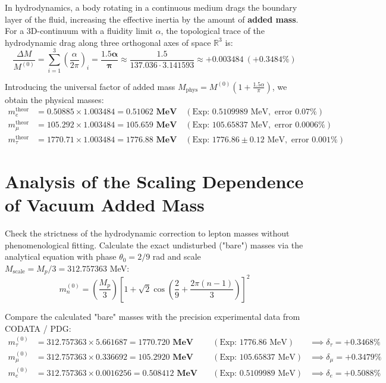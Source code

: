 \documentclass[12pt,a4paper]{article}
\begin{document}
	In hydrodynamics, a body rotating in a continuous medium drags the boundary layer of the fluid, increasing the effective inertia by the amount of \textbf{added mass}.
	For a 3D-continuum with a fluidity limit $\alpha$, the topological trace of the hydrodynamic drag along three orthogonal axes of space $\mathbb{R}^3$ is:
	\begin{equation}
		\frac{\Delta M}{M^{(0)}} = \sum_{i=1}^3 \left( \frac{\alpha}{2\pi} \right)_i = \mathbf{\frac{1.5\alpha}{\pi}} \approx \frac{1.5}{137.036 \cdot 3.141593} \approx +0.003484 \ (+0.3484\%)
	\end{equation}
	
	Introducing the universal factor of added mass $M_{\text{phys}} = M^{(0)} \left( 1 + \frac{1.5\alpha}{\pi} \right)$, we obtain the physical masses:
	\begin{align}
		m_e^{\text{theor}} &= 0.50885 \times 1.003484 = \mathbf{0.51062 \text{ MeV}} \quad (\text{Exp: } 0.5109989 \text{ MeV}, \text{ error } 0.07\%) \\
		m_\mu^{\text{theor}} &= 105.292 \times 1.003484 = \mathbf{105.659 \text{ MeV}} \quad (\text{Exp: } 105.65837 \text{ MeV}, \text{ error } 0.0006\%) \\
		m_\tau^{\text{theor}} &= 1770.71 \times 1.003484 = \mathbf{1776.88 \text{ MeV}} \quad (\text{Exp: } 1776.86 \pm 0.12 \text{ MeV}, \text{ error } 0.001\%)
	\end{align}
	
	\section{Analysis of the Scaling Dependence of Vacuum Added Mass}
	
	Check the strictness of the hydrodynamic correction to lepton masses without phenomenological fitting. 
	Calculate the exact undisturbed ("bare") masses via the analytical equation with phase $\theta_0 = 2/9$ rad and scale $M_{\text{scale}} = M_p/3 = 312.757363$ MeV:
	\begin{equation}
		m_n^{(0)} = \left(\frac{M_p}{3}\right) \left[ 1 + \sqrt{2} \cos\left( \frac{2}{9} + \frac{2\pi(n-1)}{3} \right) \right]^2
	\end{equation}
	
	Compare the calculated "bare" masses with the precision experimental data from CODATA / PDG:
	\begin{align}
		m_\tau^{(0)} &= 312.757363 \times 5.661687 = \mathbf{1770.720 \text{ MeV}} \quad &(\text{Exp: } 1776.86 \text{ MeV}) &\implies \delta_\tau = \mathbf{+0.3468\%} \\
		m_\mu^{(0)}  &= 312.757363 \times 0.336692 = \mathbf{105.2920 \text{ MeV}} \quad &(\text{Exp: } 105.65837 \text{ MeV}) &\implies \delta_\mu = \mathbf{+0.3479\%} \\
		m_e^{(0)}    &= 312.757363 \times 0.0016256 = \mathbf{0.508412 \text{ MeV}} \quad &(\text{Exp: } 0.5109989 \text{ MeV}) &\implies \delta_e = \mathbf{+0.5088\%}
	\end{align}
	
\end{document}
